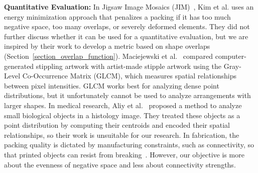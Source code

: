 \newtext
{
\textbf{Quantitative Evaluation:}
In Jigsaw Image Mosaics (JIM)~\cite{Kim2002}, Kim et al. uses an energy minimization approach
that penalizes a packing if it has too much negative space,
too many overlaps, or severely deformed elements. 
They did not further discuss whether it can be used for a quantitative evaluation,
but we are inspired by their work to develop a metric based on shape overlaps (Section~\ref{section_overlap_function}).
Maciejewski et al.~\cite{Maciejewski2008} compared computer-generated stippling artwork
with artist-made stipple artwork using the Gray-Level Co-Occurrence Matrix (GLCM),
which measures spatial relationships between pixel intensities.
GLCM works best for analyzing dense point distributions, but it unfortunately cannot be used to analyze arrangements with larger shapes.
In medical research, Aliy et al.~\cite{Aliy2013} proposed a method to analyze small biological objects in a histology image.
They treated these objects as a point distribution by computing their centroids and encoded their spatial relationships, 
so their work is unsuitable for our research.
In fabrication, the packing quality is dictated by manufacturing constraints, such as connectivity,
so that printed objects can resist from breaking~\cite{Chen2016, Zehnder2016, Martinez2019}.
However, our objective is more about the evenness of negative space and less about connectivity strengths.
}







